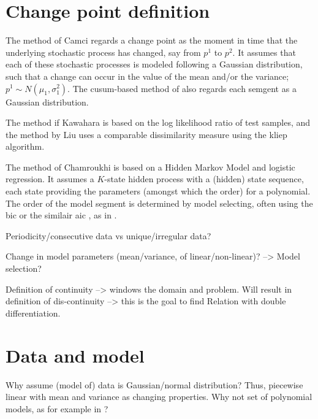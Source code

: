 \section{Change point definition}
The method of Camci \cite{camci2010change} regards a change point as the moment in time that the underlying stochastic process has changed, say from $p^1$ to $p^2$.
It assumes that each of these stochastic processes is modeled following a Gaussian distribution, such that a change can occur in the value of the mean and/or the variance; $p^1 \sim N(\mu_1, \sigma_1^2)$.
The \gls{cusum}-based method of \cite{inclan1994use} also regards each semgent as a Gaussian distribution.

The method if Kawahara \etal \cite{kawahara2009change} is based on the log likelihood ratio of test samples, and the method by Liu \etal \cite{liu2013change} uses a comparable dissimilarity measure using the \gls{kliep} algorithm.

The method of Chamroukhi \etal \cite{chamroukhi2013joint} is based on a Hidden Markov Model and logistic regression.
It assumes a $K$-state hidden process with a (hidden) state sequence, each state providing the parameters (amongst which the order) for a polynomial.
The order of the model segment is determined by model selecting, often using the \gls{bic} or the similair \gls{aic} \cite{akaike1974new}, as in \cite{he2008activity}.


Periodicity/consecutive data vs unique/irregular data?

Change in model parameters (mean/variance, of linear/non-linear)? --> Model selection?

Definition of continuity --> windows the domain and problem.
Will result in definition of dis-continuity --> this is the goal to find
Relation with double differentiation.



\section{Data and model}
Why assume (model of) data is Gaussian/normal distribution? Thus, piecewise linear with mean and variance as changing properties. Why not set of polynomial models, as for example in \cite{chamroukhi2013joint}?

